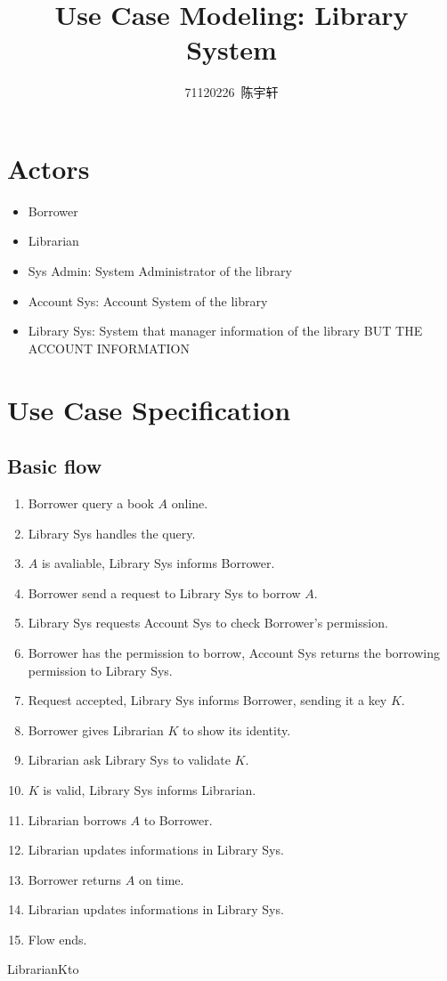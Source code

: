 \documentclass{article}
\author{71120226\ 陈宇轩}
\title{Use Case Modeling: Library System}
\begin{document}
    \maketitle

    \section{Actors}

    \begin{itemize}
        \item Borrower
        \item Librarian
        \item Sys Admin: System Administrator of the library
        \item Account Sys: Account System of the library
        \item Library Sys: System that manager information of the library BUT THE ACCOUNT INFORMATION
    \end{itemize}

    \section{Use Case Specification}
    \subsection{Basic flow}
    \label{basic_flow}

    \begin{enumerate}
        \item Borrower query a book $A$ online. \label{basic_flow-1}
        \item Library Sys handles the query.
        \item $A$ is avaliable, Library Sys informs Borrower. \label{basic_flow-3}
        \item Borrower send a request to Library Sys to borrow $A$.
        \item Library Sys requests Account Sys to check Borrower's permission.
        \item Borrower has the permission to borrow, Account Sys returns the borrowing permission to Library Sys.
        \item Request accepted, Library Sys informs Borrower, sending it a key $K$.
        \item Borrower gives Librarian $K$ to show its identity.
        \item Librarian ask Library Sys to validate $K$.
        \item $K$ is valid, Library Sys informs Librarian.
        \item Librarian borrows $A$ to Borrower.
        \item Librarian updates informations in Library Sys.
        \item Borrower returns $A$ on time.
        \item Librarian updates informations in Library Sys.
        \item Flow ends.
    \end{enumerate}
    LibrarianKto
\end{document}
